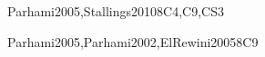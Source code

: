 \begin{syllabus}
\begin{unit}{\ARInterfacingandcommunication}{}{Parhami2005,Stallings2010}{8}{C4,C9,CS3}
\begin{learningoutcomes}
	\item \ARInterfacingandcommunicationLOExplainHowUsed [\Familiarity]
	\item \ARInterfacingandcommunicationLOIdentifyVarious [\Familiarity]
	\item \ARInterfacingandcommunicationLODescribeData [\Usage]
	\item \ARInterfacingandcommunicationLOCompare [\Assessment]
	\item \ARInterfacingandcommunicationLOIdentifyThe [\Familiarity]
	\item \ARInterfacingandcommunicationLODescribeTheLimitations [\Familiarity]
\end{learningoutcomes}
\end{unit}

\begin{unit}{\ARMultiprocessingandalternativearchitectures}{}{Parhami2005,Parhami2002,ElRewini2005}{8}{C9}
\begin{topics}
	\item \ARMultiprocessingandalternativearchitecturesTopicPower
	\item \ARMultiprocessingandalternativearchitecturesTopicExample
	\item \ARMultiprocessingandalternativearchitecturesTopicInterconnection
	\item \ARMultiprocessingandalternativearchitecturesTopicShared
	\item \ARMultiprocessingandalternativearchitecturesTopicMultiprocessor
\end{topics}

\begin{learningoutcomes}
	\item \ARMultiprocessingandalternativearchitecturesLODiscussTheParallel [\Assessment]
	\item \ARMultiprocessingandalternativearchitecturesLODescribeAlternative [\Familiarity]
	\item \ARMultiprocessingandalternativearchitecturesLOExplainTheInterconnection [\Usage]
	\item \ARMultiprocessingandalternativearchitecturesLODiscussTheThat [\Familiarity]
	\item \ARMultiprocessingandalternativearchitecturesLODescribeTheMemoryMemory [\Assessment]
\end{learningoutcomes}
\end{unit}


\end{syllabus}
